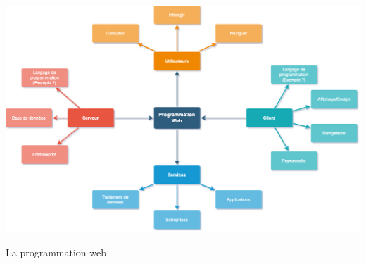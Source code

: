 \documentclass[
  ignorenonframetext,
]{beamer}
\begin{document}
\begin{frame}
\includegraphics[width=14.58333in,height=\textheight]{./images/Overview_web_programming-Page-1.png}

\begin{block}{La programmation web}
\label{la-programmation-web-3}
\end{block}
\end{frame}
\end{document}
